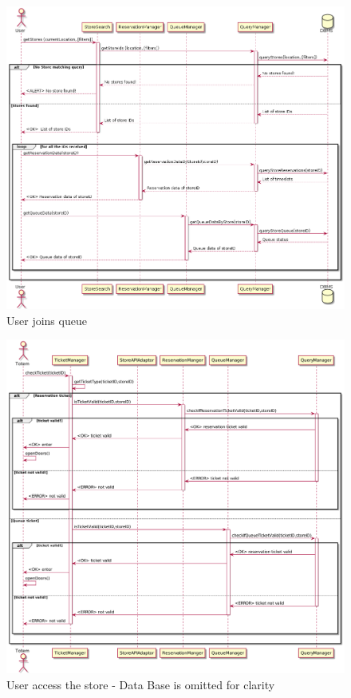 \begin{figure}[H]
    \includegraphics[width=\linewidth]{uml/seq_join_queue.png}
    \caption{User joins queue}
    \label{fig:seq_join_queue}
\end{figure}


\begin{figure}[H]
    \includegraphics[width=\linewidth]{uml/seq_user_enters_store.png}
    \caption{User access the store - Data Base is omitted for clarity}
    \label{fig:seq_user_access_store}
\end{figure}

